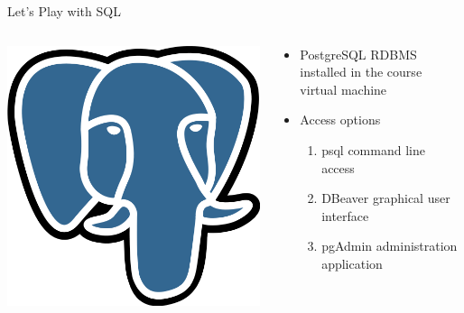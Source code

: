 \documentclass[ignorenonframetext,xcolor=x11names]{beamer}
\begin{document}
\begin{frame}{Let's Play with SQL}
\begin{columns}
\begin{column}{.15\textwidth}
\centering 
\includegraphics[width=.8\columnwidth]{postgresql-logo.png}
\end{column}
\begin{column}{.85\textwidth}
\begin{itemize}
  \item PostgreSQL RDBMS installed in the course virtual machine
  \item Access options
  \begin{enumerate}
     \item psql command line access
     \item DBeaver graphical user interface
     \item pgAdmin administration application
  \end{enumerate}
\end{itemize}
\end{column}
\end{columns}
\end{frame}
\end{document}
